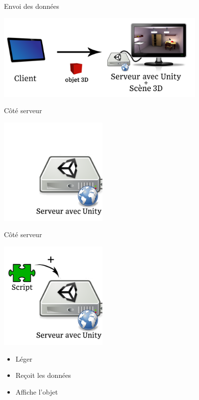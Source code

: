 \documentclass[a4paper,10pt]{beamer}
\begin{document}
	\begin{frame}{Envoi des données}
		\centerline{\includegraphics[height=120pt]{images/network/sending_model2.png}}
	\end{frame}
	
	
	\begin{frame}{Côté serveur}
		\centerline{\includegraphics[height=150pt]{images/network/plugin1.png}}
		
	\end{frame}
	\begin{frame}{Côté serveur}
		\centerline{\includegraphics[height=150pt]{images/network/plugin.png}}
		\begin{itemize}	
			\item \pause Léger \pause
			\item Reçoit les données \pause
			\item Affiche l'objet 
		\end{itemize}	
		
	\end{frame}
	
\end{document}
